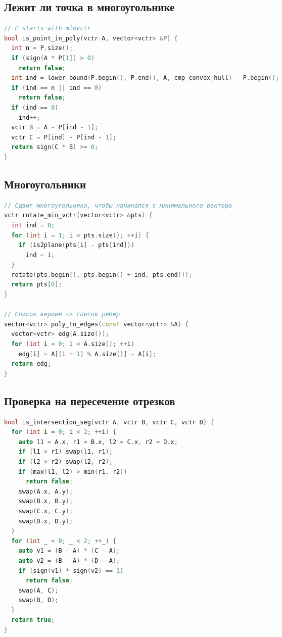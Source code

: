 \documentclass[10pt,a4paper,landscape,twosided]{extarticle}
\begin{document}
\begin{multicols*}{3}
\begin{lstlisting}[language=C++]
\end{lstlisting}

\subsection{Лежит ли точка в многоугольнике}
\begin{lstlisting}[language=C++]
// P starts with minvctr
bool is_point_in_poly(vctr A, vector<vctr> &P) {
  int n = P.size();
  if (sign(A * P[1]) > 0)
    return false;
  int ind = lower_bound(P.begin(), P.end(), A, cmp_convex_hull) - P.begin();
  if (ind == n || ind == 0)
    return false;
  if (ind == 0)
    ind++;
  vctr B = A - P[ind - 1];
  vctr C = P[ind] - P[ind - 1];
  return sign(C * B) >= 0;
}

\end{lstlisting}

\subsection{Многоугольники}
\begin{lstlisting}[language=C++]
// Сдвиг многоугольника, чтобы начинался с минимального вектора
vctr rotate_min_vctr(vector<vctr> &pts) {
  int ind = 0;
  for (int i = 1; i < pts.size(); ++i) {
    if (is2plane(pts[i] - pts[ind]))
      ind = i;
  }
  rotate(pts.begin(), pts.begin() + ind, pts.end());
  return pts[0];
}

// Список вершин -> список рёбер
vector<vctr> poly_to_edges(const vector<vctr> &A) {
  vector<vctr> edg(A.size());
  for (int i = 0; i < A.size(); ++i)
    edg[i] = A[(i + 1) % A.size()] - A[i];
  return edg;
}

\end{lstlisting}

\subsection{Проверка на пересечение отрезков}
\begin{lstlisting}[language=C++]
bool is_intersection_seg(vctr A, vctr B, vctr C, vctr D) {
  for (int i = 0; i < 2; ++i) {
    auto l1 = A.x, r1 = B.x, l2 = C.x, r2 = D.x;
    if (l1 > r1) swap(l1, r1);
    if (l2 > r2) swap(l2, r2);
    if (max(l1, l2) > min(r1, r2))
      return false;
    swap(A.x, A.y);
    swap(B.x, B.y);
    swap(C.x, C.y);
    swap(D.x, D.y);
  }
  for (int _ = 0; _ < 2; ++_) {
    auto v1 = (B - A) * (C - A);
    auto v2 = (B - A) * (D - A);
    if (sign(v1) * sign(v2) == 1)
      return false;
    swap(A, C);
    swap(B, D);
  }
  return true;
}


\end{lstlisting}
\end{multicols*}
\end{document}
